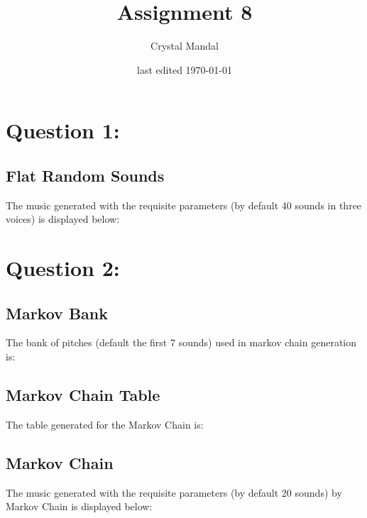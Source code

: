\documentclass[12pt,letterpaper]{article}
\title{Assignment 8}
\author{Crystal Mandal}
\date{last edited \today}
\begin{document}
\maketitle

\section{Question 1:}
\subsection{Flat Random Sounds}
The music generated with the requisite parameters (by default 40 sounds in 
three voices) is displayed below:

\begin{quote}
{%
\parindent 0pt
\noindent
\ifx\preLilyPondExample \undefined
\else
  \expandafter\preLilyPondExample
\fi
\def\lilypondbook{}%
%
\ifx\postLilyPondExample \undefined
\else
  \expandafter\postLilyPondExample
\fi
}
\end{quote}

\section{Question 2:}
\subsection{Markov Bank}
The bank of pitches (default the first 7 sounds) used in markov chain generation is:

\begin{quote}
{%
\parindent 0pt
\noindent
\ifx\preLilyPondExample \undefined
\else
  \expandafter\preLilyPondExample
\fi
\def\lilypondbook{}%
%
\ifx\postLilyPondExample \undefined
\else
  \expandafter\postLilyPondExample
\fi
}
\end{quote}

\subsection{Markov Chain Table}
The table generated for the Markov Chain is:


\subsection{Markov Chain}
The music generated with the requisite parameters (by default 20 sounds) 
by Markov Chain is displayed below:
\end{document}
